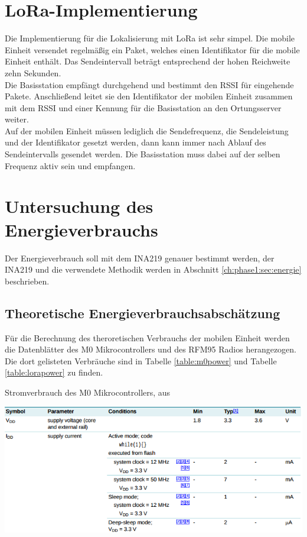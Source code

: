 \section{LoRa-Implementierung}
Die Implementierung für die Lokalisierung mit LoRa ist sehr simpel.
Die mobile Einheit versendet regelmäßig ein Paket, welches einen Identifikator für die mobile Einheit enthält.
Das Sendeintervall beträgt entsprechend der hohen Reichweite zehn Sekunden.\\
Die Basisstation empfängt durchgehend und bestimmt den RSSI für eingehende Pakete.
Anschließend leitet sie den Identifikator der mobilen Einheit zusammen mit dem RSSI und einer Kennung für die Basisstation an den Ortungsserver weiter.\\
Auf der mobilen Einheit müssen lediglich die Sendefrequenz, die Sendeleistung und der Identifikator gesetzt werden, dann kann immer nach Ablauf des Sendeintervalls gesendet werden.
Die Basisstation muss dabei auf der selben Frequenz aktiv sein und empfangen.


\section{Untersuchung des Energieverbrauchs}
Der Energieverbrauch soll mit dem INA219 genauer bestimmt werden, der INA219 und die verwendete Methodik werden in Abschnitt \ref{ch:phase1:sec:energie} beschrieben.

\subsection{Theoretische Energieverbrauchsabschätzung}
Für die Berechnung des theroretischen Verbrauchs der mobilen Einheit werden die Datenblätter des M0 Mikrocontrollers und des RFM95 Radios herangezogen. 
Die dort gelisteten Verbräuche sind in Tabelle \ref{table:m0power} und Tabelle \ref{table:lorapower} zu finden.

\begin{table}[h]
  \centering
  \caption{Stromverbrauch des M0 Mikrocontrollers, aus \cite{nxp2016m0}}
	\includegraphics[width=\textwidth]{images/m0power.png}
  \label{table:m0power}
\end{table}

